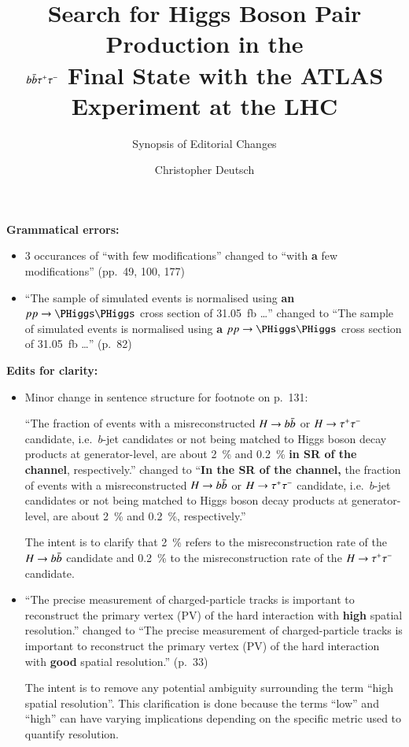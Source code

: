 \documentclass[fontsize=11pt, paper=a4]{scrartcl}
\title{Search for Higgs Boson Pair Production in the\\$b\bar{b}\tau^{+} \tau^{-}$ Final State
  with the ATLAS\\Experiment at the LHC}
\subtitle{Synopsis of Editorial Changes}
\author{Christopher Deutsch}
\date{}
\begin{document}
\maketitle
\thispagestyle{empty}


\textbf{Grammatical errors:}
\begin{itemize}

\item 3 occurances of ``with few modifications'' changed to ``with \textbf{a} few
  modifications'' (pp.\ 49, 100, 177)

\item ``The sample of simulated events is normalised using \textbf{an} $\pp \to \HH$
  cross section of \SI{31.05}{\femto\barn} \dots'' changed to ``The sample of
  simulated events is normalised using \textbf{a} $\pp \to \HH$ cross section of
  \SI{31.05}{\femto\barn} \dots'' (p.\ 82)

\end{itemize}


\textbf{Edits for clarity:}
\begin{itemize}

\item Minor change in sentence structure for footnote on p.\ 131:

  ``The fraction of events with a misreconstructed $H \to b\bar{b}$ or
  $H \to \tau^{+} \tau^{-}$ candidate, i.e.\ $b$-jet candidates or \tauhadvis not being
  matched to Higgs boson decay products at generator-level, are about
  \SI{2}{\percent} and \SI{0.2}{\percent} \textbf{in SR of the \hadhad channel},
  respectively.'' changed to ``\textbf{In the SR of the \hadhad channel,} the
  fraction of events with a misreconstructed $H \to b\bar{b}$ or $H \to \tau^{+} \tau^{-}$
  candidate, i.e.\ $b$-jet candidates or \tauhadvis not being matched to Higgs
  boson decay products at generator-level, are about \SI{2}{\percent} and
  \SI{0.2}{\percent}, respectively.''

  The intent is to clarify that \SI{2}{\percent} refers to the
  misreconstruction rate of the $H \to b\bar{b}$ candidate and \SI{0.2}{\percent}
  to the misreconstruction rate of the $H \to \tau^{+} \tau^{-}$ candidate.

\item ``The precise measurement of charged-particle tracks is important to
  reconstruct the primary vertex (PV) of the hard interaction with \textbf{high}
  spatial resolution.'' changed to ``The precise measurement of charged-particle
  tracks is important to reconstruct the primary vertex (PV) of the hard
  interaction with \textbf{good} spatial
  resolution.'' (p.\ 33)

  The intent is to remove any potential ambiguity surrounding the term ``high
  spatial resolution''. This clarification is done because the terms ``low'' and
  ``high'' can have varying implications depending on the specific metric used
  to quantify resolution.

\end{itemize}
\end{document}
